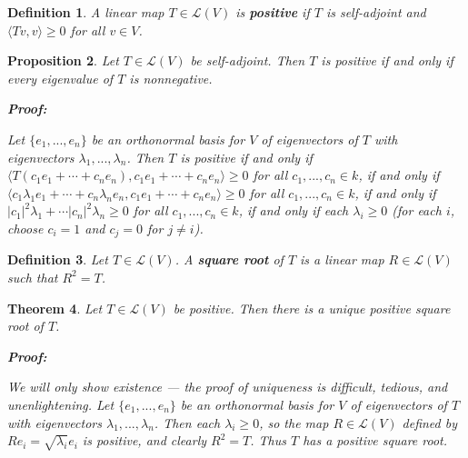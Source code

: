 \documentclass{article}
\theoremstyle{colontheorem}
\newtheorem{theorem}{Theorem}[section]
\newtheorem{proposition}[theorem]{Proposition}
\newtheorem{definition}[theorem]{Definition}
\newenvironment{Theorem}
{
	\begin{mdframed}[backgroundcolor=TheoremOrange!10]
	\begin{theorem}
}
{
	\end{theorem}
	\end{mdframed}
	
	\vspace{.15in}
}
\newenvironment{Proposition}
{
	\begin{mdframed}[backgroundcolor=PropPink!10]
	\begin{proposition}
}
{
	\end{proposition}
	\end{mdframed}
	
	\vspace{.15in}
}
\newenvironment{Def}
{
	\begin{mdframed}[backgroundcolor=DefGreen!10]
	\begin{definition}
}
{
	\end{definition}
	\end{mdframed}
	
	\vspace{.15in}
}
\newenvironment{Proof}
{
	\begin{mdframed}[backgroundcolor=ProofPurple!10]
	\textbf{Proof:}%
}
{
	\end{mdframed}
	
	\vspace{.085in}
}
\begin{document}
\begin{Def}
	
	A linear map $T \in \mathcal{L}(V)$ is \textbf{positive} if $T$ is self-adjoint and $\langle Tv, v \rangle \geq 0$ for all $v \in V$.
	
\end{Def}



\begin{Proposition}
	
	Let $T \in \mathcal{L}(V)$ be self-adjoint. Then $T$ is positive if and only if every eigenvalue of $T$ is nonnegative.
	
	\begin{Proof}
		Let $\{e_1, ..., e_n\}$ be an orthonormal basis for $V$ of eigenvectors of $T$ with eigenvectors $\lambda_1, ..., \lambda_n$. Then $T$ is positive if and only if $\langle T(c_1 e_1 + \cdots + c_n e_n), c_1 e_1 + \cdots + c_n e_n \rangle \geq 0$ for all $c_1, ..., c_n \in k$, if and only if $\langle c_1 \lambda_1 e_1 + \cdots + c_n \lambda_n  e_n, c_1 e_1 + \cdots + c_n e_n \rangle \geq 0$ for all $c_1, ..., c_n \in k$, if and only if $|c_1|^2 \lambda_1 + \cdots |c_n|^2 \lambda_n \geq 0$ for all $c_1, ..., c_n \in k$, if and only if each $\lambda_i \geq 0$ (for each $i$, choose $c_i = 1$ and $c_j = 0$ for $j \neq i$).
		
	\end{Proof}
	
\end{Proposition}



\begin{Def}
	
	Let $T \in \mathcal{L}(V)$. A \textbf{square root} of $T$ is a linear map $R \in \mathcal{L}(V)$ such that $R^2 = T$.
	
\end{Def}



\begin{Theorem}
	
	Let $T \in \mathcal{L}(V)$ be positive. Then there is a unique positive square root of $T$.
	
	\begin{Proof}
		We will only show existence --- the proof of uniqueness is difficult, tedious, and unenlightening. Let $\{e_1, ..., e_n\}$ be an orthonormal basis for $V$ of eigenvectors of $T$ with eigenvectors $\lambda_1, ..., \lambda_n$. Then each $\lambda_i \geq 0$, so the map $R \in \mathcal{L}(V)$ defined by $Re_i = \sqrt{\lambda_i} e_i$ is positive, and clearly $R^2 = T$. Thus $T$ has a positive square root.
				
	\end{Proof}
	
\end{Theorem}
\end{document}
